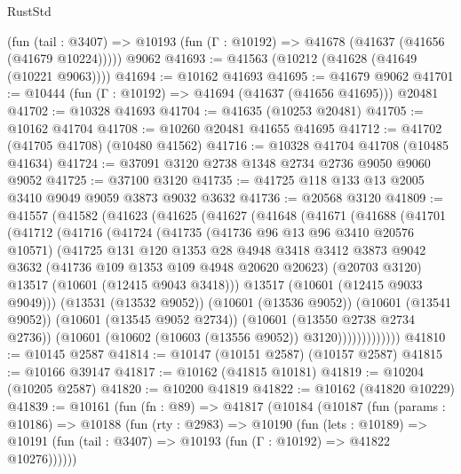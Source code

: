 \begin{lexlean}{RustStd}
\begin{coremodule}
    (fun (tail : @3407) => @10193 (fun (Γ : @10192) => @41678 (@41637 (@41656 (@41679 @10224)))))
    @9062
@41693 := @41563 (@10212 (@41628 (@41649 (@10221 @9063))))
@41694 := @10162 @41693
@41695 := @41679 @9062
@41701 := @10444 (fun (Γ : @10192) => @41694 (@41637 (@41656 @41695))) @20481
@41702 := @10328 @41693
@41704 := @41635 (@10253 @20481)
@41705 := @10162 @41704
@41708 := @10260 @20481 @41655 @41695
@41712 := @41702 (@41705 @41708) (@10480 @41562)
@41716 := @10328 @41704 @41708 (@10485 @41634)
@41724 := @37091 @3120 @2738 @1348 @2734 @2736 @9050 @9060 @9052
@41725 := @37100 @3120
@41735 := @41725 @118 @133 @13 @2005 @3410 @9049 @9059 @3873 @9032 @3632
@41736 := @20568 @3120
@41809 := @41557
    (@41582
      (@41623
        (@41625
          (@41627
            (@41648
              (@41671
                (@41688
                  (@41701
                    (@41712
                      (@41716
                        (@41724
                          (@41735
                            (@41736 @96 @13 @96 @3410 @20576 @10571)
                            (@41725
                              @131
                              @120
                              @1353
                              @28
                              @4948
                              @3418
                              @3412
                              @3873
                              @9042
                              @3632
                              (@41736 @109 @1353 @109 @4948 @20620 @20623)
                              (@20703 @3120)
                              @13517
                              (@10601 (@12415 @9043 @3418)))
                            @13517
                            (@10601 (@12415 @9033 @9049)))
                          (@13531 (@13532 @9052))
                          (@10601 (@13536 @9052))
                          (@10601 (@13541 @9052))
                          (@10601 (@13545 @9052 @2734))
                          (@10601 (@13550 @2738 @2734 @2736))
                          (@10601 (@10602 (@10603 (@13556 @9052)) @3120)))))))))))))
@41810 := @10145 @2587
@41814 := @10147 (@10151 @2587) (@10157 @2587)
@41815 := @10166 @39147
@41817 := @10162 (@41815 @10181)
@41819 := @10204 (@10205 @2587)
@41820 := @10200 @41819
@41822 := @10162 (@41820 @10229)
@41839 := @10161
    (fun (fn : @89) =>
    @41817
      (@10184
        (@10187
          (fun (params : @10186) =>
          @10188
            (fun (rty : @2983) =>
            @10190
              (fun (lets : @10189) =>
              @10191 (fun (tail : @3407) => @10193 (fun (Γ : @10192) => @41822 @10276))))))

\end{coremodule}
\end{lexlean}
